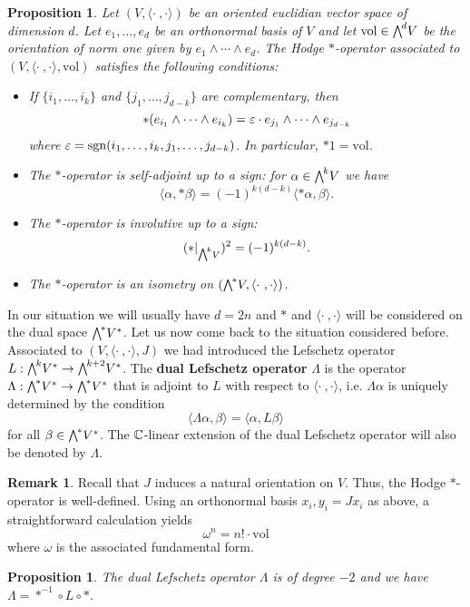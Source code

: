 \documentclass[11pt]{book}
\newtheorem{proposition}[theorem]{Proposition}
\theoremstyle{definition}
\newtheorem{remark}{Remark}[section]
\begin{document}
\begin{proposition}\label{almost complex space Hodge star operator prop}
Let $(V,\langle\cdot\ ,\cdot\rangle)$ be an oriented euclidian vector space of dimension $d$. Let $e_1,\dots,e_d$ be an orthonormal basis of $V$ and let $\mathrm{vol}\in\bigw^dV$ be the orientation of norm one given by $e_1\wedge\cdots\wedge e_d$. The Hodge $\ast$-operator associated to $(V,\langle\cdot\ ,\cdot\rangle,\mathrm{vol})$ satisfies the following conditions:
\begin{itemize}
\item[(a)] If $\{i_1,\dots,i_k\}$ and $\{j_1,\dots,j_{d-k}\}$ are complementary, then
\[\ast(e_{i_1}\wedge\cdots\wedge e_{i_k})=\varepsilon\cdot e_{j_1}\wedge\cdots\wedge e_{j_{d-k}}\]
where $\varepsilon=\mathrm{sgn}(i_1,\dots,i_k,j_1,\dots,j_{d-k})$. In particular, $\ast 1=\mathrm{vol}$. 
\item[(b)] The $\ast$-operator is self-adjoint up to a sign: for $\alpha\in\bigw^kV$ we have
\[\langle\alpha,\ast\beta\rangle=(-1)^{k(d-k)}\langle\ast\alpha,\beta\rangle.\] 
\item[(c)] The $\ast$-operator is involutive up to a sign:
\[(\ast|_{\bigw^kV})^2=(-1)^{k(d-k)}.\] 
\item[(d)] The $\ast$-operator is an isometry on $(\bigw^*V,\langle\cdot\ ,\cdot\rangle)$.
\end{itemize}
\end{proposition}
In our situation we will usually have $d=2n$ and $\ast$ and $\langle\cdot\ ,\cdot\rangle$ will be considered on the dual space $\bigw^*V^*$. Let us now come back to the situation considered before. Associated to $(V,\langle\cdot\ ,\cdot\rangle,J)$ we had introduced the Lefschetz operator $L:\bigw^kV^*\to\bigw^{k+2}V^*$. The \textbf{dual Lefschetz operator} $\Lambda$ is the operator $\Lambda:\bigw^*V^*\to\bigw^*V^*$ that is adjoint to $L$ with respect to $\langle\cdot\ ,\cdot\rangle$, i.e. $\Lambda\alpha$ is uniquely determined by the condition
\[\langle\Lambda\alpha,\beta\rangle=\langle\alpha,L\beta\rangle\]
for all $\beta\in\bigw^*V^*$. The $\mathbb{C}$-linear extension of the dual Lefschetz operator will also be denoted by $\Lambda$.
\begin{remark}
Recall that $J$ induces a natural orientation on $V$. Thus, the Hodge $\ast$-operator is well-defined. Using an orthonormal basis $x_i,y_i=Jx_i$ as above, a straightforward calculation yields
\[\omega^n=n!\cdot\mathrm{vol}\]
where $\omega$ is the associated fundamental form.
\end{remark}
\begin{proposition}\label{almost complex space Lefschetz dual operator expression}
The dual Lefschetz operator $\Lambda$ is of degree $-2$ and we have $\Lambda=\ast^{-1}\circ L\circ\ast$.
\end{proposition}
\end{document}
